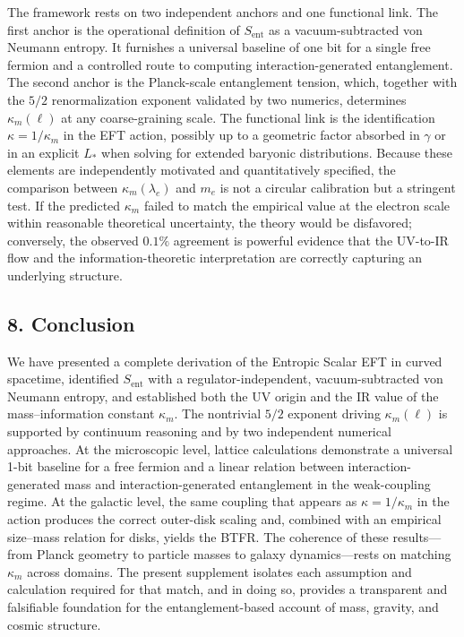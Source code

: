 \documentclass[11pt]{article}
\begin{document}
The framework rests on two independent anchors and one functional link. The first anchor is the operational definition of $S_{\mathrm{ent}}$ as a vacuum-subtracted von Neumann entropy. It furnishes a universal baseline of one bit for a single free fermion and a controlled route to computing interaction-generated entanglement. The second anchor is the Planck-scale entanglement tension, which, together with the $5/2$ renormalization exponent validated by two numerics, determines $\kappa_m(\ell)$ at any coarse-graining scale. The functional link is the identification $\kappa = 1/\kappa_m$ in the EFT action, possibly up to a geometric factor absorbed in $\gamma$ or in an explicit $L_\ast$ when solving for extended baryonic distributions. Because these elements are independently motivated and quantitatively specified, the comparison between $\kappa_m(\lambda_e)$ and $m_e$ is not a circular calibration but a stringent test. If the predicted $\kappa_m$ failed to match the empirical value at the electron scale within reasonable theoretical uncertainty, the theory would be disfavored; conversely, the observed $0.1\%$ agreement is powerful evidence that the UV-to-IR flow and the information-theoretic interpretation are correctly capturing an underlying structure.

\subsection*{8. Conclusion}

We have presented a complete derivation of the Entropic Scalar EFT in curved spacetime, identified $S_{\mathrm{ent}}$ with a regulator-independent, vacuum-subtracted von Neumann entropy, and established both the UV origin and the IR value of the mass–information constant $\kappa_m$. The nontrivial $5/2$ exponent driving $\kappa_m(\ell)$ is supported by continuum reasoning and by two independent numerical approaches. At the microscopic level, lattice calculations demonstrate a universal 1-bit baseline for a free fermion and a linear relation between interaction-generated mass and interaction-generated entanglement in the weak-coupling regime. At the galactic level, the same coupling that appears as $\kappa = 1/\kappa_m$ in the action produces the correct outer-disk scaling and, combined with an empirical size–mass relation for disks, yields the BTFR. The coherence of these results—from Planck geometry to particle masses to galaxy dynamics—rests on matching $\kappa_m$ across domains. The present supplement isolates each assumption and calculation required for that match, and in doing so, provides a transparent and falsifiable foundation for the entanglement-based account of mass, gravity, and cosmic structure.
\end{document}
